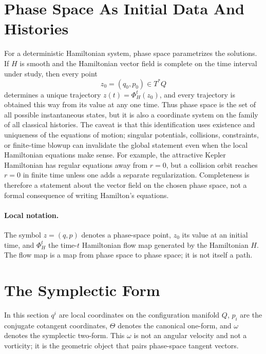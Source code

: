 \section{Phase Space As Initial Data And Histories}
\label{sec:phase-space-solutions}

For a deterministic Hamiltonian system, phase space parametrizes the solutions.
If \(H\) is smooth and the Hamiltonian vector field is complete on the time
interval under study, then every point
\[
  z_0=(q_0,p_0)\in T^*Q
\]
determines a unique trajectory \(z(t)=\Phi^t_H(z_0)\), and every trajectory is
obtained this way from its value at any one time. Thus phase space is the set
of all possible instantaneous states, but it is also a coordinate system on the
family of all classical histories. The caveat is that this identification uses
existence and uniqueness of the equations of motion; singular potentials,
collisions, constraints, or finite-time blowup can invalidate the global
statement even when the local Hamiltonian equations make sense. For example,
the attractive Kepler Hamiltonian has regular equations away from \(r=0\), but
a collision orbit reaches \(r=0\) in finite time unless one adds a separate
regularization. Completeness is therefore a statement about the vector field on
the chosen phase space, not a formal consequence of writing Hamilton's
equations.

\paragraph{Local notation.}
The symbol \(z=(q,p)\) denotes a phase-space point, \(z_0\) its value at an
initial time, and \(\Phi_H^t\) the time-\(t\) Hamiltonian flow map generated by
the Hamiltonian \(H\).  The flow map is a map from phase space to phase space;
it is not itself a path.

\section{The Symplectic Form}
\label{sec:symplectic-form}

In this section \(q^i\) are local coordinates on the configuration manifold
\(Q\), \(p_i\) are the conjugate cotangent coordinates, \(\Theta\) denotes the
canonical one-form, and \(\omega\) denotes the symplectic two-form.  This
\(\omega\) is not an angular velocity and not a vorticity; it is the geometric
object that pairs phase-space tangent vectors.

